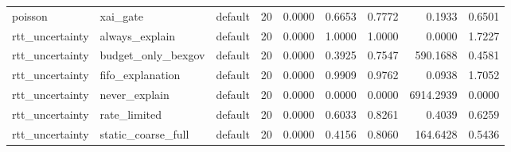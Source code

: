 \begin{table}[t]
\begin{tabular}{lllrrrrrr}
poisson & xai\_gate & default & 20 & 0.0000 & 0.6653 & 0.7772 & 0.1933 & 0.6501 \\
rtt\_uncertainty & always\_explain & default & 20 & 0.0000 & 1.0000 & 1.0000 & 0.0000 & 1.7227 \\
rtt\_uncertainty & budget\_only\_bexgov & default & 20 & 0.0000 & 0.3925 & 0.7547 & 590.1688 & 0.4581 \\
rtt\_uncertainty & fifo\_explanation & default & 20 & 0.0000 & 0.9909 & 0.9762 & 0.0938 & 1.7052 \\
rtt\_uncertainty & never\_explain & default & 20 & 0.0000 & 0.0000 & 0.0000 & 6914.2939 & 0.0000 \\
rtt\_uncertainty & rate\_limited & default & 20 & 0.0000 & 0.6033 & 0.8261 & 0.4039 & 0.6259 \\
rtt\_uncertainty & static\_coarse\_full & default & 20 & 0.0000 & 0.4156 & 0.8060 & 164.6428 & 0.5436 \\
\bottomrule
\end{tabular}
\end{table}
